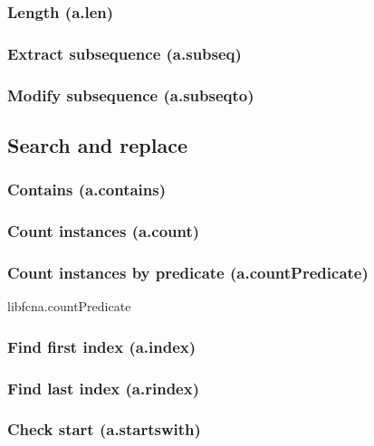 \documentclass{article}
\theoremstyle{definition}
\begin{document}
\subsubsection{Length (a.len)}

\subsubsection{Extract subsequence (a.subseq)}

\subsubsection{Modify subsequence (a.subseqto)}

\subsection{Search and replace}

\subsubsection{Contains (a.contains)}

\subsubsection{Count instances (a.count)}

\subsubsection{Count instances by predicate (a.countPredicate)}
libfcn{a.countPredicate}

\subsubsection{Find first index (a.index)}

\subsubsection{Find last index (a.rindex)}

\subsubsection{Check start (a.startswith)}
\end{document}

